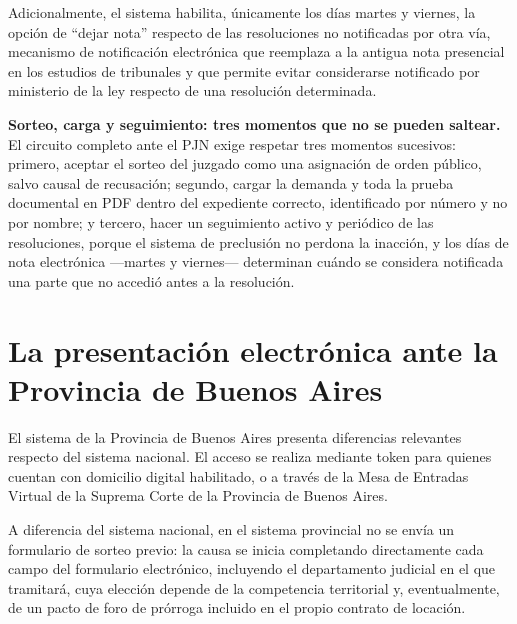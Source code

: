 \documentclass[12pt,oneside]{book}
\begin{document}
Adicionalmente, el sistema habilita, únicamente los días martes y viernes, la opción de ``dejar nota'' respecto de las resoluciones no notificadas por otra vía, mecanismo de notificación electrónica que reemplaza a la antigua nota presencial en los estudios de tribunales y que permite evitar considerarse notificado por ministerio de la ley respecto de una resolución determinada.

\begin{important}
\textbf{Sorteo, carga y seguimiento: tres momentos que no se pueden saltear.} El circuito completo ante el PJN exige respetar tres momentos sucesivos: primero, aceptar el sorteo del juzgado como una asignación de orden público, salvo causal de recusación; segundo, cargar la demanda y toda la prueba documental en PDF dentro del expediente correcto, identificado por número y no por nombre; y tercero, hacer un seguimiento activo y periódico de las resoluciones, porque el sistema de preclusión no perdona la inacción, y los días de nota electrónica —martes y viernes— determinan cuándo se considera notificada una parte que no accedió antes a la resolución.
\end{important}

\section{La presentación electrónica ante la Provincia de Buenos Aires}

El sistema de la Provincia de Buenos Aires presenta diferencias relevantes respecto del sistema nacional. El acceso se realiza mediante token para quienes cuentan con domicilio digital habilitado, o a través de la Mesa de Entradas Virtual de la Suprema Corte de la Provincia de Buenos Aires.

A diferencia del sistema nacional, en el sistema provincial no se envía un formulario de sorteo previo: la causa se inicia completando directamente cada campo del formulario electrónico, incluyendo el departamento judicial en el que tramitará, cuya elección depende de la competencia territorial y, eventualmente, de un pacto de foro de prórroga incluido en el propio contrato de locación.
\end{document}
